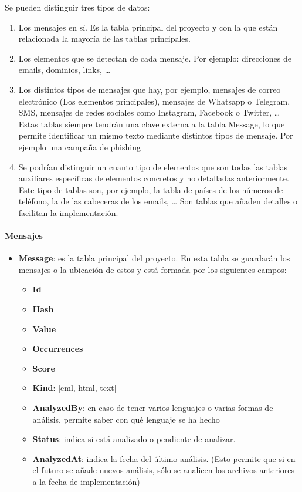Se pueden distinguir tres tipos de datos: 

\begin{enumerate}
    \item Los mensajes en sí. Es la tabla principal del proyecto y con la que están relacionada la mayoría de las tablas principales.
    \item Los elementos que se detectan de cada mensaje. Por ejemplo: direcciones de emails, dominios, links, …
    \item Los distintos tipos de mensajes que hay, por ejemplo, mensajes de correo electrónico (Los elementos principales), mensajes de Whatsapp o Telegram, SMS, mensajes de redes sociales como Instagram, Facebook o Twitter, …
    Estas tablas siempre tendrán una clave externa a la tabla Message, lo que permite identificar un mismo texto mediante distintos tipos de mensaje. Por ejemplo una campaña de phishing 
    \item Se podrían distinguir un cuanto tipo de elementos que son todas las tablas auxiliares específicas de elementos concretos y no detalladas anteriormente. Este tipo de tablas son, por ejemplo, la tabla de países de los números de teléfono, la de las cabeceras de los emails, … Son tablas que añaden detalles o facilitan la implementación. 
    
\end{enumerate}

\paragraph{Mensajes}
\begin{itemize}
    \item \textbf{Message}: es la tabla principal del proyecto. En esta tabla se guardarán los mensajes o la ubicación de estos y está formada por los siguientes campos: 
\begin{itemize}
    \item \textbf{Id}
    \item \textbf{Hash}
    \item \textbf{Value}
    \item \textbf{Occurrences}
    \item \textbf{Score}
    \item \textbf{Kind}: [eml, html, text]
    \item \textbf{AnalyzedBy}: en caso de tener varios lenguajes o varias formas de análisis, permite saber con qué lenguaje se ha hecho
    \item \textbf{Status}: indica si está analizado o pendiente de analizar.
    \item \textbf{AnalyzedAt}: indica la fecha del último análisis. (Esto permite que si en el futuro se añade nuevos análisis, sólo se analicen los archivos anteriores a la fecha de implementación)
\end{itemize}
\end{itemize}
